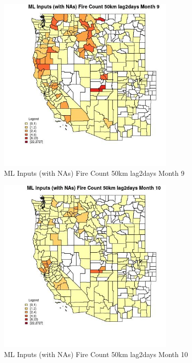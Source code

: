 \begin{figure} 
\centering  
\includegraphics[width=0.77\textwidth]{Code_Outputs/Report_ML_input_PM25_Step4_part_f_de_duplicated_aves_prioritize_24hr_obswNAs_CountyFire_Count_50km_lag2daysmedianMonth9.jpg} 
\caption{\label{fig:Report_ML_input_PM25_Step4_part_f_de_duplicated_aves_prioritize_24hr_obswNAsCountyFire_Count_50km_lag2daysmedianMonth9}ML Inputs (with NAs) Fire Count 50km lag2days Month 9} 
\end{figure} 
 

\begin{figure} 
\centering  
\includegraphics[width=0.77\textwidth]{Code_Outputs/Report_ML_input_PM25_Step4_part_f_de_duplicated_aves_prioritize_24hr_obswNAs_CountyFire_Count_50km_lag2daysmedianMonth10.jpg} 
\caption{\label{fig:Report_ML_input_PM25_Step4_part_f_de_duplicated_aves_prioritize_24hr_obswNAsCountyFire_Count_50km_lag2daysmedianMonth10}ML Inputs (with NAs) Fire Count 50km lag2days Month 10} 
\end{figure} 
 


